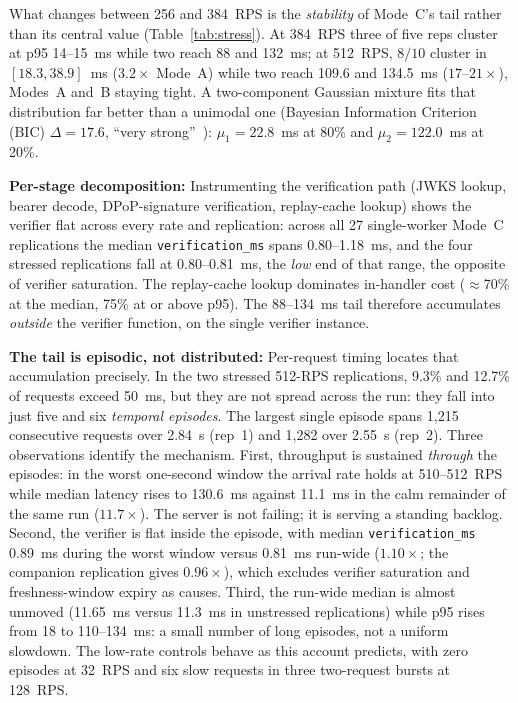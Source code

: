 \documentclass[conference]{IEEEtran}
\begin{document}
What changes between 256 and 384~RPS is the \emph{stability} of Mode~C's tail rather than its central value (Table~\ref{tab:stress}). At 384~RPS three of five reps cluster at p95 14--15~ms while two reach 88 and 132~ms; at 512~RPS, $8/10$ cluster in $[18.3, 38.9]$~ms ($3.2\times$ Mode~A) while two reach 109.6 and 134.5~ms ($17$--$21\times$), Modes~A and~B staying tight. A two-component Gaussian mixture fits that distribution far better than a unimodal one (Bayesian Information Criterion (BIC) $\Delta = 17.6$, ``very strong''~\cite{raftery1995bayesian}): $\mu_1 = 22.8$~ms at 80\% and $\mu_2 = 122.0$~ms at 20\%.

\textbf{Per-stage decomposition:} Instrumenting the verification path (JWKS lookup, bearer decode, DPoP-signature verification, replay-cache lookup) shows the verifier flat across every rate and replication: across all 27 single-worker Mode~C replications the median \texttt{verification\_ms} spans 0.80--1.18~ms, and the four stressed replications fall at 0.80--0.81~ms, the \emph{low} end of that range, the opposite of verifier saturation. The replay-cache lookup dominates in-handler cost ($\approx$70\% at the median, 75\% at or above p95). The 88--134~ms tail therefore accumulates \emph{outside} the verifier function, on the single verifier instance.

\textbf{The tail is episodic, not distributed:} Per-request timing locates that accumulation precisely. In the two stressed 512-RPS replications, 9.3\% and 12.7\% of requests exceed 50~ms, but they are not spread across the run: they fall into just five and six \emph{temporal episodes}. The largest single episode spans 1{,}215 consecutive requests over 2.84~s (rep~1) and 1{,}282 over 2.55~s (rep~2). Three observations identify the mechanism. First, throughput is sustained \emph{through} the episodes: in the worst one-second window the arrival rate holds at 510--512~RPS while median latency rises to 130.6~ms against 11.1~ms in the calm remainder of the same run ($11.7\times$). The server is not failing; it is serving a standing backlog. Second, the verifier is flat inside the episode, with median \texttt{verification\_ms} 0.89~ms during the worst window versus 0.81~ms run-wide ($1.10\times$; the companion replication gives $0.96\times$), which excludes verifier saturation and freshness-window expiry as causes. Third, the run-wide median is almost unmoved (11.65~ms versus 11.3~ms in unstressed replications) while p95 rises from 18 to 110--134~ms: a small number of long episodes, not a uniform slowdown. The low-rate controls behave as this account predicts, with zero episodes at 32~RPS and six slow requests in three two-request bursts at 128~RPS.
\end{document}

